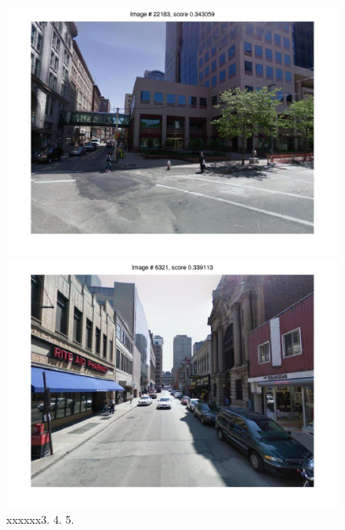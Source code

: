 \documentclass[10pt,onecolumn,A4]{article}
\begin{document}
\begin{figure}
\begin{minipage}{0.45\linewidth}
		\colorbox{myCopper4}{\includegraphics[trim = 55mm 40mm 55mm 30mm, clip=true,width=0.30\linewidth]{sup1666/svm04.jpg}}
		\colorbox{myCopper5}{\includegraphics[trim = 55mm 40mm 55mm 30mm, clip=true,width=0.30\linewidth]{sup1666/svm05.jpg}}  \\
		\textcolor{myWhite}{xxxxxx}3. \hspace{0.25\linewidth}4. \hspace{0.25\linewidth}5. \\
	\end{minipage}
\end{figure}
\end{document}
